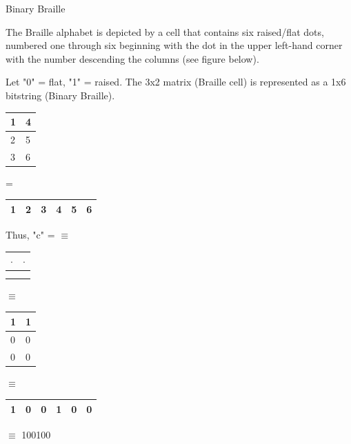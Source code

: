 \documentclass[final]{beamer}
\begin{document}
\begin{frame}{}
\begin{columns}[t]
\begin{column}{.3\linewidth}
\begin{block}{{\small Binary Braille}}
\begin{itemize} {\scriptsize
\item The Braille alphabet is depicted by a cell that contains six raised/flat dots, numbered one through six beginning with the dot in the upper left-hand corner with the number descending the columns (see figure below). 
\item Let "0" = flat, "1" = raised. The 3x2 matrix (Braille cell) is represented as a 1x6 bitstring (Binary Braille). \newline
\item \begin{tabular}{|l|l|}
\hline 1 & 4  \\ \hline 2&5 \\ \hline  3 & 6\\ \hline
\end{tabular} = \begin{tabular}{|l|l|l|l|l|l|}
\hline 1 & 2 & 3 & 4 & 5 & 6 \\ \hline
\end{tabular} 
\item Thus, "c" =  $\equiv$
\begin{tabular}{|l|l|}
\hline $\cdot$ & $\cdot$ \\ \hline & \\ \hline  & \\ \hline
\end{tabular} $\equiv$
 \begin{tabular}{|l|l|}
\hline 1 & 1  \\ \hline 0&0 \\ \hline  0 & 0 \\ \hline
\end{tabular} $\equiv$
\begin{tabular}{|l|l|l|l|l|l|}
\hline 1 & 0 & 0 & 1 & 0 & 0 \\ \hline
\end{tabular} $\equiv$ 100100}
\end{itemize}
\vspace{-50pt}  
\end{block}


\end{column}
\end{columns}
\end{frame}
\end{document}
